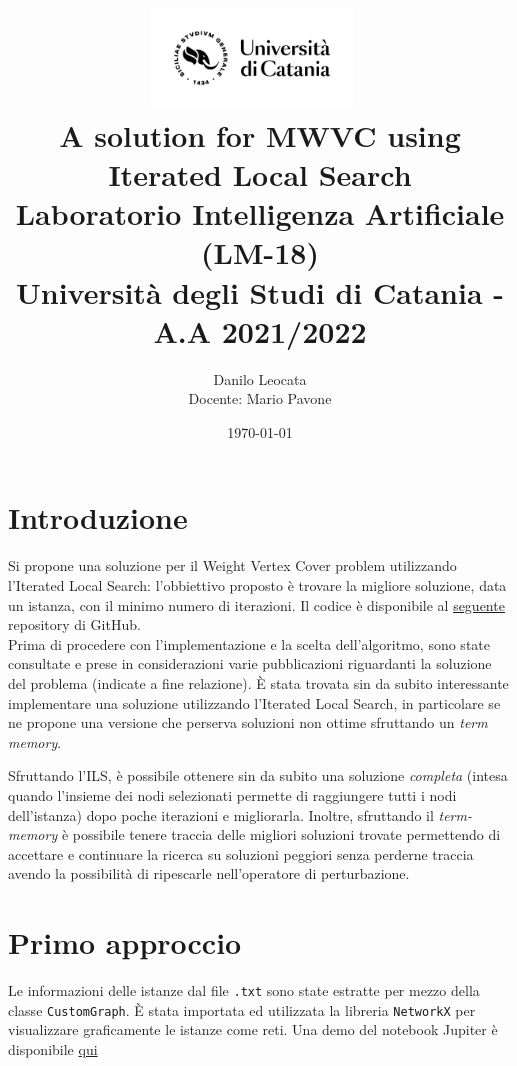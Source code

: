 \documentclass[11pt]{article}
\title{ %
\includegraphics[width=0.4\textwidth]{UniCT-Logo-Nero}~\\
A solution for MWVC using Iterated Local Search \\ 
\large Laboratorio Intelligenza Artificiale (LM-18) \\ Università degli Studi di Catania - A.A 2021/2022 \\
}
\author{ Danilo Leocata \\ Docente: Mario Pavone}
\date{\today}
\begin{document}
\maketitle	
\pagebreak



\section{Introduzione}

Si propone una soluzione per il Weight Vertex Cover problem utilizzando l'Iterated Local Search: l'obbiettivo proposto è trovare la migliore soluzione, data un istanza, con il minimo numero di iterazioni. Il codice è disponibile al \href{https://github.com/khalld/mwvc-using-ils}{seguente} repository di GitHub. \\
Prima di procedere con l'implementazione e la scelta dell'algoritmo, sono state consultate e prese in considerazioni varie pubblicazioni riguardanti la soluzione del problema (indicate a fine relazione). È stata trovata sin da subito interessante implementare una soluzione utilizzando l'Iterated Local Search, in particolare se ne propone una versione che perserva soluzioni non ottime sfruttando un \textit{term memory}.

Sfruttando l'ILS, è possibile ottenere sin da subito una soluzione \textit{completa} (intesa quando l'insieme dei nodi selezionati permette di raggiungere tutti i nodi dell'istanza) dopo poche iterazioni e migliorarla. Inoltre, sfruttando il \textit{term-memory} è possibile tenere traccia delle migliori soluzioni trovate permettendo di accettare e continuare la ricerca su soluzioni peggiori senza perderne traccia avendo la possibilità di ripescarle nell'operatore di perturbazione.

\pagebreak
\section{Primo approccio}

Le informazioni delle istanze dal file \verb|.txt| sono state estratte per mezzo della classe \verb|CustomGraph|.
È stata importata ed utilizzata la libreria \verb|NetworkX| per visualizzare graficamente le istanze come reti. Una demo del notebook Jupiter è disponibile \href{https://github.com/khalld/mwvc-using-ils/blob/main/visualize-instances.ipynb}{qui}
\end{document}
